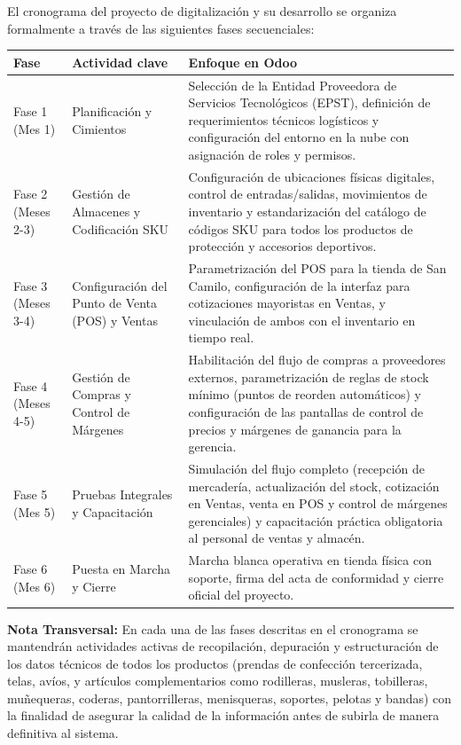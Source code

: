 \begin{indentedsubsection}
El cronograma del proyecto de digitalización y su desarrollo se organiza formalmente a través de las siguientes fases secuenciales:

\renewcommand{\arraystretch}{1.4}
\begin{tabularx}{\textwidth}{|>{\raggedright\arraybackslash}p{2.2cm}|>{\raggedright\arraybackslash}p{3.8cm}|X|}
    \hline
    \textbf{Fase} & \textbf{Actividad clave} & \textbf{Enfoque en Odoo} \\ \hline
    Fase 1 (Mes 1) & Planificación y Cimientos & Selección de la Entidad Proveedora de Servicios Tecnológicos (EPST), definición de requerimientos técnicos logísticos y configuración del entorno en la nube con asignación de roles y permisos. \\ \hline
    Fase 2 (Meses 2-3) & Gestión de Almacenes y Codificación SKU & Configuración de ubicaciones físicas digitales, control de entradas/salidas, movimientos de inventario y estandarización del catálogo de códigos SKU para todos los productos de protección y accesorios deportivos. \\ \hline
    Fase 3 (Meses 3-4) & Configuración del Punto de Venta (POS) y Ventas & Parametrización del POS para la tienda de San Camilo, configuración de la interfaz para cotizaciones mayoristas en Ventas, y vinculación de ambos con el inventario en tiempo real. \\ \hline
    Fase 4 (Meses 4-5) & Gestión de Compras y Control de Márgenes & Habilitación del flujo de compras a proveedores externos, parametrización de reglas de stock mínimo (puntos de reorden automáticos) y configuración de las pantallas de control de precios y márgenes de ganancia para la gerencia. \\ \hline
    Fase 5 (Mes 5) & Pruebas Integrales y Capacitación & Simulación del flujo completo (recepción de mercadería, actualización del stock, cotización en Ventas, venta en POS y control de márgenes gerenciales) y capacitación práctica obligatoria al personal de ventas y almacén. \\ \hline
    Fase 6 (Mes 6) & Puesta en Marcha y Cierre & Marcha blanca operativa en tienda física con soporte, firma del acta de conformidad y cierre oficial del proyecto. \\ \hline
\end{tabularx}

\vspace{0.3cm}
\textbf{Nota Transversal:} En cada una de las fases descritas en el cronograma se mantendrán actividades activas de recopilación, depuración y estructuración de los datos técnicos de todos los productos (prendas de confección tercerizada, telas, avíos, y artículos complementarios como rodilleras, musleras, tobilleras, muñequeras, coderas, pantorrilleras, menisqueras, soportes, pelotas y bandas) con la finalidad de asegurar la calidad de la información antes de subirla de manera definitiva al sistema.
\end{indentedsubsection}

